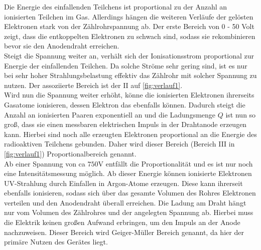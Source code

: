 Die Energie des einfallenden Teilchens ist proportional zu der Anzahl an ionisierten Teilchen im Gas.
Allerdings hängen die weiteren Verläufe der gelösten Elektronen stark von der Zählrohrspannung ab.
Der erste Bereich von 0 - 50 Volt zeigt, dass die entkoppelten Elektronen zu schwach sind, sodass sie rekombinieren bevor sie den Anodendraht erreichen.\\
Steigt die Spannung weiter an, verhält sich der Ionisationsstrom proportional zur Energie der einfallenden Teilchen.
Da solche Ströme sehr gering sind, ist es nur bei sehr hoher Strahlungsbelastung effektiv das Zählrohr mit solcher Spannung zu nutzen.
Der assoziierte Bereich ist der II auf \autoref{fig:verlauf1}.\\
Wird nun die Spannung weiter erhöht, könne die ionisierten Elektronen ihrerseits Gasatome ionisieren, dessen Elektron das ebenfalls können.
Dadurch steigt die Anzahl an ionisierten Paaren exponentiell an und die Ladungsmenge $Q$ ist nun so groß, dass sie einen messbaren elektrischen Impuls in der Drahtanode erzeugen kann.
Hierbei sind noch alle erzeugten Elektronen proportional an die Energie des radioaktiven Teilchens gebunden.
Daher wird dieser Bereich (Bereich III in \ref{fig:verlauf1}) Proportionalbereich genannt.\\
Ab einer Spannung von ca $750\si{\volt}$ entfällt die Proportionalität und es ist nur noch eine Intensitätsmessung möglich.
Ab dieser Energie können ionisierte Elektronen UV-Strahlung durch Einfallen in Argon-Atome erzeugen.
Diese kann ihrerseit ebenfalls ionisieren, sodass sich über das gesamte Volumen des Rohres Elektronen verteilen und den Anodendraht überall erreichen.
Die Ladung am Draht hängt nur vom Volumen des Zählrohres und der angelegten Spannung ab.
Hierbei muss die Elektrik keinen großen Aufwand erbringen, um den Impuls an der Anode nachzuweisen.
Dieser Bereich wird Geiger-Müller Bereich genannt, da hier der primäre Nutzen des Gerätes liegt.

